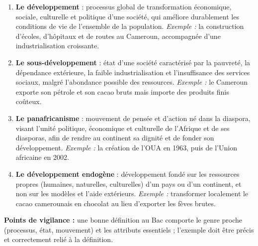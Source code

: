\documentclass[11pt]{article}
\begin{document}
\begin{corrige}
\begin{enumerate}
\item \textbf{Le développement} : processus global de transformation économique, sociale, culturelle et politique d'une société, qui améliore durablement les conditions de vie de l'ensemble de la population. \emph{Exemple :} la construction d'écoles, d'hôpitaux et de routes au Cameroun, accompagnée d'une industrialisation croissante.
\item \textbf{Le sous-développement} : état d'une société caractérisé par la pauvreté, la dépendance extérieure, la faible industrialisation et l'insuffisance des services sociaux, malgré l'abondance possible des ressources. \emph{Exemple :} le Cameroun exporte son pétrole et son cacao bruts mais importe des produits finis coûteux.
\item \textbf{Le panafricanisme} : mouvement de pensée et d'action né dans la diaspora, visant l'unité politique, économique et culturelle de l'Afrique et de ses diasporas, afin de rendre au continent sa dignité et de fonder son développement. \emph{Exemple :} la création de l'OUA en 1963, puis de l'Union africaine en 2002.
\item \textbf{Le développement endogène} : développement fondé sur les ressources propres (humaines, naturelles, culturelles) d'un pays ou d'un continent, et non sur les modèles et l'aide extérieurs. \emph{Exemple :} transformer localement le cacao camerounais en chocolat au lieu d'exporter les fèves brutes.
\end{enumerate}
\textbf{Points de vigilance :} une bonne définition au Bac comporte le genre proche (processus, état, mouvement) et les attributs essentiels ; l'exemple doit être précis et correctement relié à la définition.
\end{corrige}
\end{document}
